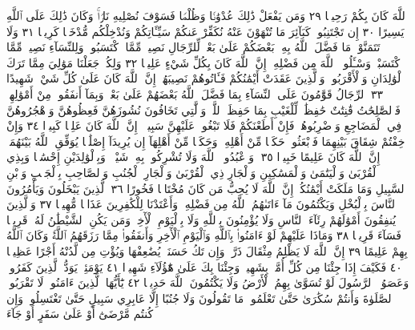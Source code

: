 ٱللَّهَ كَانَ بِكُمْ رَحِيمࣰا ٢٩ وَمَن يَفْعَلْ ذَٰلِكَ عُدْوَٰنࣰا
وَظُلْمࣰا فَسَوْفَ نُصْلِيهِ نَارࣰاۚ وَكَانَ ذَٰلِكَ عَلَى ٱللَّهِ
يَسِيرًا ٣٠ إِن تَجْتَنِبُوا۟ كَبَآئِرَ مَا تُنْهَوْنَ عَنْهُ نُكَفِّرْ
عَنكُمْ سَيِّـَٔاتِكُمْ وَنُدْخِلْكُم مُّدْخَلࣰا كَرِيمࣰا ٣١
وَلَا تَتَمَنَّوْا۟ مَا فَضَّلَ ٱللَّهُ بِهِۦ بَعْضَكُمْ عَلَىٰ بَعْضࣲۚ لِّلرِّجَالِ
نَصِيبࣱ مِّمَّا ٱكْتَسَبُوا۟ۖ وَلِلنِّسَآءِ نَصِيبࣱ مِّمَّا ٱكْتَسَبْنَۚ
وَسْـَٔلُوا۟ ٱللَّهَ مِن فَضْلِهِۦٓۚ إِنَّ ٱللَّهَ كَانَ بِكُلِّ شَيْءٍ
عَلِيمࣰا ٣٢ وَلِكُلࣲّ جَعَلْنَا مَوَٰلِيَ مِمَّا تَرَكَ ٱلْوَٰلِدَانِ
وَٱلْأَقْرَبُونَۚ وَٱلَّذِينَ عَقَدَتْ أَيْمَٰنُكُمْ فَـَٔاتُوهُمْ
نَصِيبَهُمْۚ إِنَّ ٱللَّهَ كَانَ عَلَىٰ كُلِّ شَيْءࣲ شَهِيدًا ٣٣
ٱلرِّجَالُ قَوَّٰمُونَ عَلَى ٱلنِّسَآءِ بِمَا فَضَّلَ ٱللَّهُ بَعْضَهُمْ عَلَىٰ
بَعْضࣲ وَبِمَآ أَنفَقُوا۟ مِنْ أَمْوَٰلِهِمْۚ فَٱلصَّٰلِحَٰتُ قَٰنِتَٰتٌ
حَٰفِظَٰتࣱ لِّلْغَيْبِ بِمَا حَفِظَ ٱللَّهُۚ وَٱلَّٰتِي تَخَافُونَ
نُشُوزَهُنَّ فَعِظُوهُنَّ وَٱهْجُرُوهُنَّ فِي ٱلْمَضَاجِعِ
وَٱضْرِبُوهُنَّۖ فَإِنْ أَطَعْنَكُمْ فَلَا تَبْغُوا۟ عَلَيْهِنَّ سَبِيلًاۗ
إِنَّ ٱللَّهَ كَانَ عَلِيࣰّا كَبِيرࣰا ٣٤ وَإِنْ خِفْتُمْ شِقَاقَ بَيْنِهِمَا
فَٱبْعَثُوا۟ حَكَمࣰا مِّنْ أَهْلِهِۦ وَحَكَمࣰا مِّنْ أَهْلِهَآ إِن
يُرِيدَآ إِصْلَٰحࣰا يُوَفِّقِ ٱللَّهُ بَيْنَهُمَآۗ إِنَّ ٱللَّهَ كَانَ عَلِيمًا
خَبِيرࣰا ٣٥۞ وَٱعْبُدُوا۟ ٱللَّهَ وَلَا تُشْرِكُوا۟ بِهِۦ شَيْـࣰٔاۖ
وَبِٱلْوَٰلِدَيْنِ إِحْسَٰنࣰا وَبِذِي ٱلْقُرْبَىٰ وَٱلْيَتَٰمَىٰ وَٱلْمَسَٰكِينِ
وَٱلْجَارِ ذِي ٱلْقُرْبَىٰ وَٱلْجَارِ ٱلْجُنُبِ وَٱلصَّاحِبِ بِٱلْجَنۢبِ
وَٱبْنِ ٱلسَّبِيلِ وَمَا مَلَكَتْ أَيْمَٰنُكُمْۗ إِنَّ ٱللَّهَ
لَا يُحِبُّ مَن كَانَ مُخْتَالࣰا فَخُورًا ٣٦ ٱلَّذِينَ يَبْخَلُونَ
وَيَأْمُرُونَ ٱلنَّاسَ بِٱلْبُخْلِ وَيَكْتُمُونَ مَآ ءَاتَىٰهُمُ
ٱللَّهُ مِن فَضْلِهِۦۗ وَأَعْتَدْنَا لِلْكَٰفِرِينَ عَذَابࣰا مُّهِينࣰا ٣٧
وَٱلَّذِينَ يُنفِقُونَ أَمْوَٰلَهُمْ رِئَآءَ ٱلنَّاسِ وَلَا يُؤْمِنُونَ بِٱللَّهِ
وَلَا بِٱلْيَوْمِ ٱلْأٓخِرِۗ وَمَن يَكُنِ ٱلشَّيْطَٰنُ لَهُۥ قَرِينࣰا فَسَآءَ
قَرِينࣰا ٣٨ وَمَاذَا عَلَيْهِمْ لَوْ ءَامَنُوا۟ بِٱللَّهِ وَٱلْيَوْمِ ٱلْأٓخِرِ وَأَنفَقُوا۟
مِمَّا رَزَقَهُمُ ٱللَّهُۚ وَكَانَ ٱللَّهُ بِهِمْ عَلِيمًا ٣٩ إِنَّ ٱللَّهَ لَا يَظْلِمُ
مِثْقَالَ ذَرَّةࣲۖ وَإِن تَكُ حَسَنَةࣰ يُضَٰعِفْهَا وَيُؤْتِ مِن لَّدُنْهُ
أَجْرًا عَظِيمࣰا ٤٠ فَكَيْفَ إِذَا جِئْنَا مِن كُلِّ أُمَّةِۭ بِشَهِيدࣲ
وَجِئْنَا بِكَ عَلَىٰ هَٰٓؤُلَآءِ شَهِيدࣰا ٤١ يَوْمَئِذࣲ يَوَدُّ ٱلَّذِينَ
كَفَرُوا۟ وَعَصَوُا۟ ٱلرَّسُولَ لَوْ تُسَوَّىٰ بِهِمُ ٱلْأَرْضُ وَلَا يَكْتُمُونَ
ٱللَّهَ حَدِيثࣰا ٤٢ يَٰٓأَيُّهَا ٱلَّذِينَ ءَامَنُوا۟ لَا تَقْرَبُوا۟ ٱلصَّلَوٰةَ وَأَنتُمْ
سُكَٰرَىٰ حَتَّىٰ تَعْلَمُوا۟ مَا تَقُولُونَ وَلَا جُنُبًا إِلَّا عَابِرِي
سَبِيلٍ حَتَّىٰ تَغْتَسِلُوا۟ۚ وَإِن كُنتُم مَّرْضَىٰٓ أَوْ عَلَىٰ سَفَرٍ أَوْ جَآءَ
